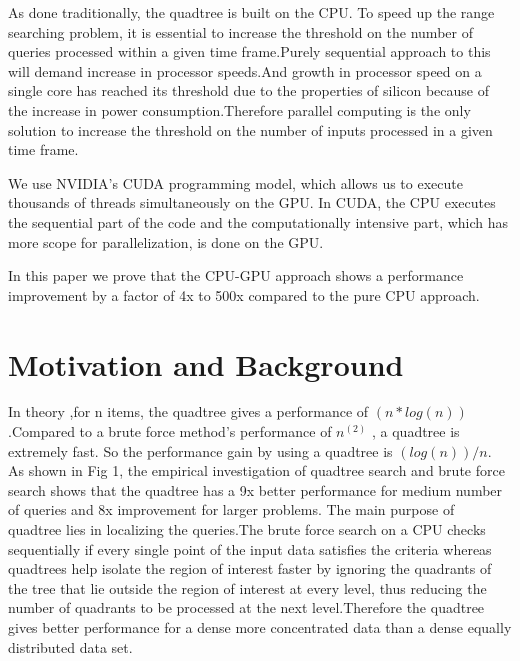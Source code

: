 \documentclass{article}
\begin{document}
As done traditionally, the quadtree is built on the CPU. To speed up the range searching problem, it is essential to increase the threshold on the number of queries processed within a given time frame.Purely sequential approach to this will demand increase in processor speeds.And growth in processor speed on a single core has reached its threshold due to the properties of silicon because of  the increase in power consumption.Therefore parallel computing is the only solution to increase the threshold on the number of inputs processed in a given time frame. 

We use NVIDIA's CUDA programming model, which allows us to execute thousands of threads simultaneously on the GPU. In CUDA, the CPU executes the sequential part of the code and the computationally intensive part, which has more scope for parallelization, is done on the GPU. 

In this paper we prove that the CPU-GPU approach shows a performance improvement by a factor of 4x to 500x compared to the pure CPU approach.





\section{Motivation and Background}

In theory ,for n items, the quadtree gives a  performance of ${(n*log(n))}$ .Compared to a brute force method's performance of $n^{(2)}$ , a quadtree is extremely fast. So the performance gain by using a quadtree is ${(log(n))/n}$.  
As shown in Fig 1, the empirical investigation of quadtree search and brute force search shows that the quadtree has a 9x better performance for medium number of queries and 8x improvement for larger problems.
The main purpose of quadtree lies in localizing the queries.The brute force search on a CPU checks sequentially if every single point of the input data satisfies the criteria whereas quadtrees help isolate the region of interest faster by ignoring the quadrants of the tree that lie outside the region of interest at every level, thus reducing the number of quadrants to be processed at the next level.Therefore the quadtree gives better performance for a dense more concentrated data than a dense equally distributed data set.
\end{document}
